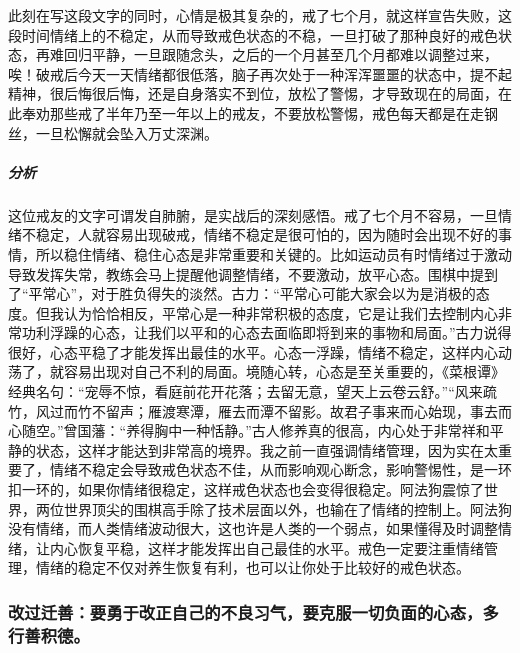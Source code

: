 \begin{case}[情绪管理]
    此刻在写这段文字的同时，心情是极其复杂的，戒了七个月，就这样宣告失败，这段时间情绪上的不稳定，从而导致戒色状态的不稳，一旦打破了那种良好的戒色状态，再难回归平静，一旦跟随念头，之后的一个月甚至几个月都难以调整过来，唉！破戒后今天一天情绪都很低落，脑子再次处于一种浑浑噩噩的状态中，提不起精神，很后悔很后悔，还是自身落实不到位，放松了警惕，才导致现在的局面，在此奉劝那些戒了半年乃至一年以上的戒友，不要放松警惕，戒色每天都是在走钢丝，一旦松懈就会坠入万丈深渊。
    \subparagraph{分析} 这位戒友的文字可谓发自肺腑，是实战后的深刻感悟。戒了七个月不容易，一旦情绪不稳定，人就容易出现破戒，情绪不稳定是很可怕的，因为随时会出现不好的事情，所以稳住情绪、稳住心态是非常重要和关键的。比如运动员有时情绪过于激动导致发挥失常，教练会马上提醒他调整情绪，不要激动，放平心态。围棋中提到了“平常心”，对于胜负得失的淡然。古力：“平常心可能大家会以为是消极的态度。但我认为恰恰相反，平常心是一种非常积极的态度，它是让我们去控制内心非常功利浮躁的心态，让我们以平和的心态去面临即将到来的事物和局面。”古力说得很好，心态平稳了才能发挥出最佳的水平。心态一浮躁，情绪不稳定，这样内心动荡了，就容易出现对自己不利的局面。境随心转，心态是至关重要的，《菜根谭》经典名句：“宠辱不惊，看庭前花开花落；去留无意，望天上云卷云舒。”“风来疏竹，风过而竹不留声；雁渡寒潭，雁去而潭不留影。故君子事来而心始现，事去而心随空。”曾国藩：“养得胸中一种恬静。”古人修养真的很高，内心处于非常祥和平静的状态，这样才能达到非常高的境界。我之前一直强调情绪管理，因为实在太重要了，情绪不稳定会导致戒色状态不佳，从而影响观心断念，影响警惕性，是一环扣一环的，如果你情绪很稳定，这样戒色状态也会变得很稳定。阿法狗震惊了世界，两位世界顶尖的围棋高手除了技术层面以外，也输在了情绪的控制上。阿法狗没有情绪，而人类情绪波动很大，这也许是人类的一个弱点，如果懂得及时调整情绪，让内心恢复平稳，这样才能发挥出自己最佳的水平。戒色一定要注重情绪管理，情绪的稳定不仅对养生恢复有利，也可以让你处于比较好的戒色状态。
\end{case}

\subsubsection{改过迁善：要勇于改正自己的不良习气，要克服一切负面的心态，多行善积德。}


